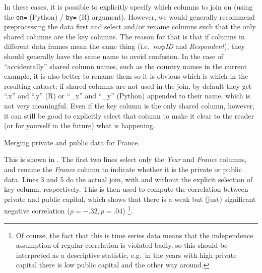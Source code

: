 {In these cases, it is possible to explicitly specify which columns to join on (using the \verb+on=+ (Python) / \verb+by=+ (R) argument).
However, we would generally recommend preprocessing the data first and select and/or rename columns such that the only shared columns are the key columns.
The reason for that is that if columns in different data frames mean the same thing (i.e.\ \emph{respID} and \emph{Respondent}), they should generally have the same name to avoid confusion.
In the case of ``accidentally'' shared column names, such as the country names in the current example,
it is also better to rename them so it is obvious which is which in the resulting dataset:
if shared columns are not used in the join, by default they get ``.x'' and ``.y'' (R) or ``\_x'' and ``\_y'' (Python) appended to their name, which is not very meaningful.
Even if the key column is the only shared column, however, it can still be good to explicitly select that column to make it clear to the reader (or for yourself in the future) what is happening.

\begin{ccsexample}
\caption{Merging private and public data for France.}\label{ex:merge}
\end{ccsexample}

This is shown in .
The first two lines select only the \emph{Year} and \emph{France} columns, and rename the \emph{France} column to indicate whether it is the private or public data.
Lines 3 and 5 do the actual join, with and without the explicit selection of key column, respectively.
This is then used to compute the correlation between private and public capital,
which shows that there is a weak but (just) significant negative correlation ($\rho=-.32, p=.04$)%
\footnote{Of course, the fact that this is time series data means that the independence assumption of regular correlation is violated badly, so this should be interpreted as a descriptive statistic, e.g.\ in the years with high private capital there is low public capital and the other way around.}.




}
